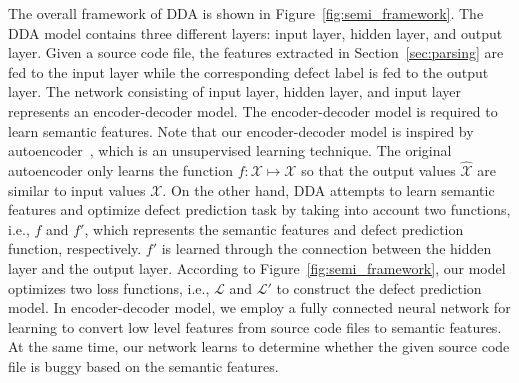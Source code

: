 The overall framework of DDA is shown in Figure~\ref{fig:semi_framework}. The DDA model contains three different layers: input layer, hidden layer, and output layer. Given a source code file, the features extracted in Section~\ref{sec:parsing} are fed to the input layer while the corresponding defect label is fed to the output layer. The network consisting of input layer, hidden layer, and input layer represents an encoder-decoder model. The encoder-decoder model is required to learn semantic features. Note that our encoder-decoder model is inspired by autoencoder~\cite{ng2011sparse}, which is an unsupervised learning technique. The original autoencoder only learns the function $f: \mathcal{X} \longmapsto \mathcal{X}$ so that the output values $\mathcal{\hat{X}}$ are similar to input values $\mathcal{X}$. On the other hand, DDA attempts to learn semantic features and optimize defect prediction task by taking into account two functions, i.e., $f$ and $f'$, which represents the semantic features and defect prediction function, respectively. $f'$ is learned through the connection between the hidden layer and the output layer. According to Figure~\ref{fig:semi_framework}, our model optimizes two loss functions, i.e., $\mathcal{L}$ and $\mathcal{L'}$ to construct the defect prediction model. In encoder-decoder model, we employ a fully connected neural network for learning to convert low level features from source code files to semantic features. At the same time, our network learns to determine whether the given source code file is buggy based on the semantic features. 


